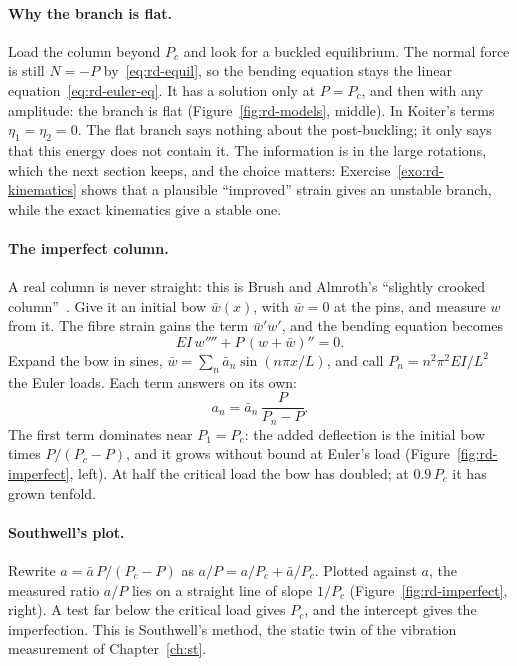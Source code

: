 \paragraph{Why the branch is flat.}
Load the column beyond $P_c$ and look for a buckled equilibrium. The normal force is still
$N = -P$ by~\eqref{eq:rd-equil}, so the bending equation stays the linear
equation~\eqref{eq:rd-euler-eq}. It has a solution only at $P = P_c$, and then with any amplitude:
the branch is flat (Figure~\ref{fig:rd-models}, middle). In Koiter's terms $\eta_1 = \eta_2 = 0$.
The flat branch says nothing about the post-buckling; it only says that this energy does not
contain it. The information is in the large rotations, which the next section keeps, and the
choice matters: Exercise~\ref{exo:rd-kinematics} shows that a plausible ``improved'' strain
gives an unstable branch, while the exact kinematics give a stable one.

\paragraph{The imperfect column.}
%
A real column is never straight: this is Brush and Almroth's ``slightly crooked
column''~\cite[Section~1.4]{rd-brush1975}. Give it an initial bow $\bar w(x)$, with $\bar w = 0$ at the
pins, and measure $w$ from it. The fibre strain gains the term $\bar w' w'$, and the bending
equation becomes~\cite{rd-triantafyllidis2018}
\begin{equation}\label{eq:rd-imperfect}
  EI\,w'''' + P\,(w + \bar w)'' = 0 .
\end{equation}
Expand the bow in sines, $\bar w = \sum_n \bar a_n \sin(n\pi x/L)$, and call
$P_n = n^2\pi^2EI/L^2$ the Euler loads. Each term answers on its own:
\begin{equation}\label{eq:rd-amplification}
  a_n = \bar a_n\,\frac{P}{P_n - P} .
\end{equation}
The first term dominates near $P_1 = P_c$: the added deflection is the initial bow times
$P/(P_c - P)$, and it grows without bound at Euler's load (Figure~\ref{fig:rd-imperfect}, left).
At half the critical load the bow has doubled; at $0.9\,P_c$ it has grown tenfold.

\paragraph{Southwell's plot.}
%
Rewrite $a = \bar a\,P/(P_c - P)$ as $a/P = a/P_c + \bar a/P_c$. Plotted against $a$, the measured
ratio $a/P$ lies on a straight line of slope $1/P_c$ (Figure~\ref{fig:rd-imperfect}, right). A
test far below the critical load gives $P_c$, and the intercept gives the imperfection. This
is Southwell's method, the static twin of the vibration measurement of Chapter~\ref{ch:st}.

